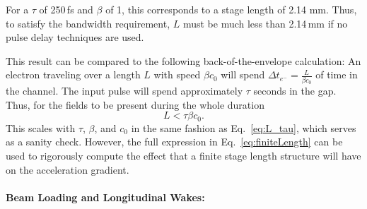 For a $\tau$ of 250\,fs and $\beta$ of 1, this corresponds to a stage length of 2.14 mm. Thus, to satisfy the bandwidth requirement, $L$ must be much less than 2.14\,mm if no pulse delay techniques are used. 

This result can be compared to the following back-of-the-envelope calculation: An electron traveling over a length $L$ with speed $\beta c_0$ will spend $\Delta t_{e^-} = \frac{L}{\beta c_0}$ of time in the channel. The input pulse will spend approximately $\tau$ seconds in the gap. Thus, for the fields to be present during the whole duration
\begin{equation}
L < \tau \beta c_0.
\end{equation}
This scales with $\tau$, $\beta$, and $c_0$ in the same fashion as Eq.~\ref{eq:L_tau}, which serves as a sanity check.  However, the full expression in Eq.~\ref{eq:finiteLength} can be used to rigorously compute the effect that a finite stage length structure will have on the acceleration gradient.

\paragraph{Beam Loading and Longitudinal Wakes:}

